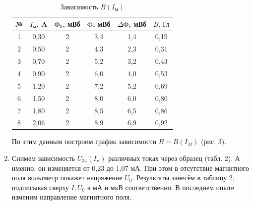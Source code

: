 \documentclass[12pt]{kiarticle}
\begin{document}
\begin{enumerate}
  		
  	
  		\begin{table}[]
  			\caption{Зависимость $B(I_{м})$}
  		\begin{center}
  		\begin{tabular}{|c|c|c|c|c|c|} 
  			\hline 
  			№ &  $I_{м}$, A &  $Ф_{0}$, мВб & $Ф$, мВб & $\Delta Ф$, мВб & $B, Тл$  \\ 	\hline
  			
  			1 & 0,30 & 2 & 3,4 & 1,4 & 0,19 \\
  			2 & 0,50 & 2 & 4,3 & 2,3 & 0,31 \\
  			3 & 0,70 & 2 & 5,2 & 3,2 & 0,43 \\
  			4 & 0,90 & 2 & 6,0 & 4,0 & 0,53 \\
  			5 & 1,20 & 2 & 7,2 & 5,2 & 0,69 \\
  			6 & 1,50 & 2 & 8,0 & 6,0 & 0,80\\
  			7 & 1,80 & 2 & 8,5 & 6,5 & 0,86\\
  			8 & 2,06 & 2 & 8,9 & 6,9 & 0,92\\
  			\hline
  			
  		\end{tabular}
  	\end{center}
  \end{table}

  	По этим данным построим график зависимости $B=B(I_{M})$ (рис. 3).
  	
  	\item Снимем зависимость $U_{34}(I_{м})$ различных токах через образец (табл. 2). А именно, он изменяется от 0,23 до 1,07 мА. При этом в отсутствие магнитного поля вольтметр покажет напряжение $U_{0}$. Результаты занесём в таблицу 2, подписывая сверху $ I, U_0 $  в мА и мкВ соответственно. В последнем опыте изменим направление магнитного поля.  
  

\end{enumerate}
\end{document}
